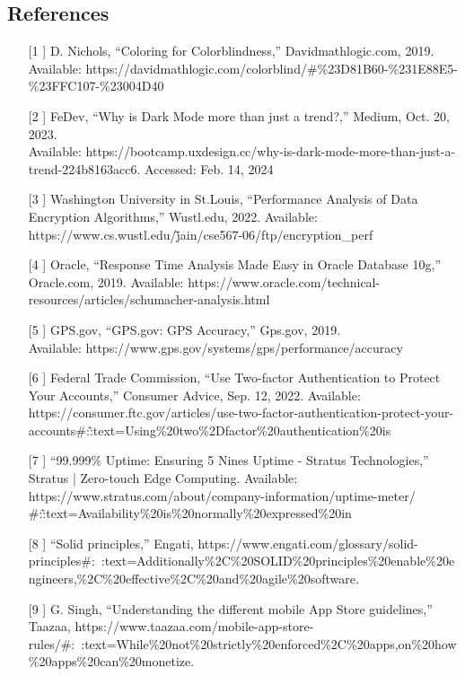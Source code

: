 \documentclass[]{article}
\begin{document}
\subsection{References}
\label{sub:references}
\begin{itemize}
	\item[[1]] D. Nichols, “Coloring for Colorblindness,” Davidmathlogic.com, 2019.
	\\Available: https://davidmathlogic.com/colorblind/\#\%23D81B60-\%231E88E5-\%23FFC107-\%23004D40
	\item[[2]] FeDev, “Why is Dark Mode more than just a trend?,” Medium, Oct. 20, 2023.
	\\Available: https://bootcamp.uxdesign.cc/why-is-dark-mode-more-than-just-a-trend-224b8163acc6. Accessed: Feb. 14, 2024
	\item[[3]] Washington University in St.Louis, “Performance Analysis of Data Encryption Algorithms,” Wustl.edu, 2022.
	Available: https://www.cs.wustl.edu/\~jain/cse567-06/ftp/encryption\_perf
	\item[[4]] Oracle, “Response Time Analysis Made Easy in Oracle Database 10g,” Oracle.com, 2019.
	Available: https://www.oracle.com/technical-resources/articles/schumacher-analysis.html
	\item[[5]] GPS.gov, “GPS.gov: GPS Accuracy,” Gps.gov, 2019.
	\\Available: https://www.gps.gov/systems/gps/performance/accuracy
	\item[[6]] Federal Trade Commission, “Use Two-factor Authentication to Protect Your Accounts,” Consumer Advice, Sep. 12, 2022.
	Available: https://consumer.ftc.gov/articles/use-two-factor-authentication-protect-your-accounts\#:\~:text=Using\%20two\%2Dfactor\%20authentication\%20is
	\item[[7]] “99.999\% Uptime: Ensuring 5 Nines Uptime - Stratus Technologies,” Stratus | Zero-touch Edge Computing. Available: https://www.stratus.com/about/company-information/uptime-meter/
	\\\#:\~:text=Availability\%20is\%20normally\%20expressed\%20in
	\item[[8]] “Solid principles,” Engati, https://www.engati.com/glossary/solid-principles\#:~:text=Additionally\%2C\%20SOLID\%20principles\%20enable\%20engineers,\%2C\%20effective\%2C\%20and\%20agile\%20software.
	\item[[9]] G. Singh, “Understanding the different mobile App Store guidelines,” Taazaa, https://www.taazaa.com/mobile-app-store-rules/\#:~:text=While\%20not\%20strictly\%20enforced\%2C\%20apps,on\%20how\%20apps\%20can\%20monetize.

\end{itemize}
\end{document}
